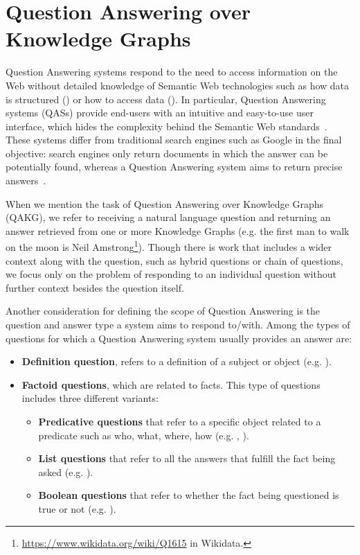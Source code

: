 \section{Question Answering over Knowledge Graphs}
\label{cap2:qakg}
Question Answering systems respond to the need to access information on the Web without 
detailed knowledge of Semantic Web technologies such as how data is structured (\RDF{}) or how to 
access data (\SPARQL{}). In particular, Question Answering systems (QASs) provide end-users with an 
intuitive and easy-to-use user interface, which hides the complexity behind the Semantic Web 
standards~\cite{qa:intro-UngerFC14}. These systems differ from traditional search engines such 
as Google in the final objective: search engines only return documents in which the answer can be 
potentially found, whereas a Question Answering system aims to return precise answers~\cite{qa:LopezUSM11}.

When we mention the task of Question Answering over Knowledge Graphs (QAKG), we refer to 
receiving a natural language question and returning an answer retrieved from one or more 
Knowledge Graphs (e.g. the first man to walk on the moon is Neil 
Amstrong\footnote{\url{https://www.wikidata.org/wiki/Q1615} in Wikidata.}). Though there is work 
that includes a wider context along with the question, such as hybrid questions or chain of 
questions, we focus only on the problem of responding to an individual question without further 
context besides the question itself.

Another consideration for defining the scope of Question Answering is the question and answer 
type a system aims to respond to/with. Among the types of questions for which a Question 
Answering system usually provides an answer are:

\begin{itemize}
    \item \textbf{Definition question}, refers to a definition of a subject or object (e.g. 
    ).
    \item \textbf{Factoid questions}, which are related to facts. This type of questions 
    includes three different variants:
    \begin{itemize}
        \item \textbf{Predicative questions} that refer to a specific object related to a predicate 
        such as who, what, where, how (e.g. , 
        ).
        \item \textbf{List questions} that refer to all the answers that fulfill the fact being 
        asked (e.g. ).
        \item \textbf{Boolean questions} that refer to whether the fact being questioned is true 
        or not (e.g. ).
    \end{itemize}
\end{itemize}

